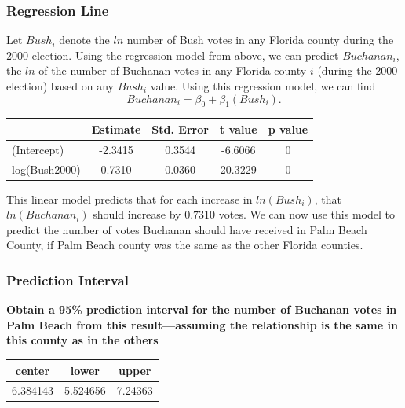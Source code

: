 \documentclass[
  letterpaper,
  DIV=11,
  numbers=noendperiod]{scrartcl}
\begin{document}
\hypertarget{regression-line}{%
\subsubsection{Regression Line}\label{regression-line}}

Let \(Bush_i\) denote the \(ln\) number of Bush votes in any Florida
county during the 2000 election. Using the regression model from above,
we can predict \(Buchanan_i\), the \(ln\) of the number of Buchanan
votes in any Florida county \(i\) (during the 2000 election) based on
any \(Bush_i\) value. Using this regression model, we can find
\[Buchanan_i = \beta_0 + \beta_1\left(Bush_i\right).\]

\begin{table}[H]
\centering
\begin{tabular}[t]{lcccc}
\toprule
  & Estimate & Std. Error & t value & p value\\
\midrule
(Intercept) & -2.3415 & 0.3544 & -6.6066 & 0\\
log(Bush2000) & 0.7310 & 0.0360 & 20.3229 & 0\\
\bottomrule
\end{tabular}
\end{table}

This linear model predicts that for each increase in \(ln(Bush_i)\),
that \(ln(Buchanan_i)\) should increase by \(0.7310\) votes. We can now
use this model to predict the number of votes Buchanan should have
received in Palm Beach County, if Palm Beach county was the same as the
other Florida counties.

\hypertarget{prediction-interval}{%
\subsubsection{Prediction Interval}\label{prediction-interval}}

\textbf{Obtain a 95\% prediction interval for the number of Buchanan
votes in Palm Beach from this result---assuming the relationship is the
same in this county as in the others}

\begin{table}[H]
\centering
\begin{tabular}[t]{ccc}
\toprule
center & lower & upper\\
\midrule
6.384143 & 5.524656 & 7.24363\\
\bottomrule
\end{tabular}
\end{table}
\end{document}
